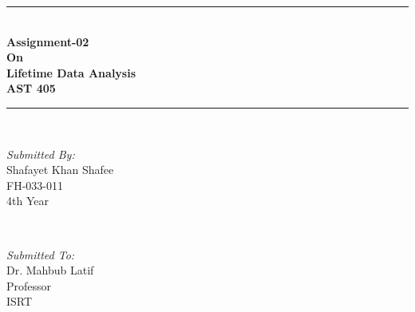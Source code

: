 \documentclass[12pt]{article}
\begin{document}
\begin{titlepage}

\newcommand{\HRule}{\rule{\linewidth}{0.5mm}} %

\center %




\begin{minipage}{3cm}
\vspace{3cm}
\end{minipage}


\HRule \\[0.25cm]
{ \huge \bfseries Assignment-02}\\[0.06cm]
{ \huge \bfseries On}\\[0.1cm]
{ \huge \bfseries Lifetime Data Analysis}\\[0.08cm]
{ \LARGE \bfseries AST 405}\\[0.05cm]
\HRule \\[1.5cm]



\begin{minipage}{0.4\textwidth}
\begin{flushleft} \large
\emph{Submitted By:}\\
Shafayet Khan Shafee \\FH-033-011\\4th Year
\end{flushleft}
\end{minipage}
~
\begin{minipage}{0.4\textwidth}
\begin{flushright} \large
\emph{Submitted To:} \\
Dr. Mahbub Latif\\Professor\\ISRT
\end{flushright}
\end{minipage}\\[1cm]


\end{titlepage}
\end{document}
